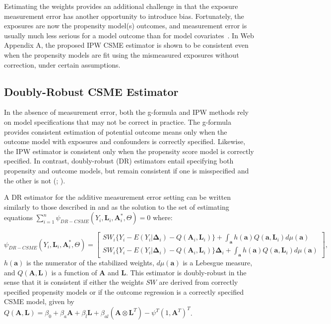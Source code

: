\documentclass[useAMS,usenatbib,referee]{biom}
\begin{document}
Estimating the weights provides an additional challenge in that the exposure measurement error has another opportunity to introduce bias. Fortunately, the exposures are now the propensity model(s) outcomes, and measurement error is usually much less serious for a model outcome than for model covariates~\citep{carroll2006}. In Web Appendix A, the proposed IPW CSME estimator is shown to be consistent even when the propensity models are fit using the mismeasured exposures without correction, under certain assumptions.

\subsection{Doubly-Robust CSME Estimator}

In the absence of measurement error, both the g-formula and IPW methods rely on model specifications that may not be correct in practice. The g-formula provides consistent estimation of potential outcome means only when the outcome model with exposures and confounders is correctly specified. Likewise, the IPW estimator is consistent only when the propensity score model is correctly specified. In contrast, doubly-robust (DR) estimators entail specifying both propensity and outcome models, but remain consistent if one is misspecified and the other is not (\citealp*{robins1994}; \citealp{lunceford2004,bang2005}).

A DR estimator for the additive measurement error setting can be written similarly to those described in \citet{robins2000b} and \citet{neugebauer2005} as the solution to the set of estimating equations $\sum_{i=1}^{n} \psi_{DR-CSME}(Y_{i}, \bm{L}_{i}, \bm{A}^{*}_{i}, \Theta) = 0$ where:

\begin{equation*}
    \psi_{DR-CSME}(Y_{i}, \bm{L}_{i}, \bm{A}^{*}_{i}, \Theta) =
    \begin{bmatrix}
       SW_{i} \{ Y_{i} - E(Y_{i} | \bm{\Delta}_{i}) - Q(\bm{A}_{i}, \bm{L}_{i}) \} + \int_{\bm{a}} h(\bm{a})Q(\bm{a}, \bm{L}_{i})d\mu (\bm{a}) \\
       SW_{i} \{ Y_{i} - E(Y_{i} | \bm{\Delta}_{i}) - Q(\bm{A}_{i}, \bm{L}_{i}) \} \bm{\Delta}_{i} + \int_{\bm{a}} h(\bm{a})Q(\bm{a}, \bm{L}_{i})d\mu (\bm{a})
    \end{bmatrix},
\end{equation*}
$h(\bm{a})$ is the numerator of the stabilized weights, $d\mu (\bm{a})$ is a Lebesgue measure, and $Q(\bm{A}, \bm{L})$ is a function of $\bm{A}$ and $\bm{L}$. This estimator is doubly-robust in the sense that it is consistent if either the weights $SW$ are derived from correctly specified propensity models or if the outcome regression is a correctly specified CSME model, given by $Q(\bm{A}, \bm{L}) = \beta_{0} + \beta_{a}\bm{A} + \beta_{l}\bm{L} + \beta_{al}(\bm{A} \otimes \bm{L}^{T}) - \psi^{T}(1, \bm{A}^{T})^{T}$.
\end{document}
